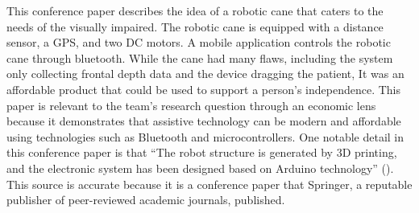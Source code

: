 
This conference paper describes the idea of a robotic cane that caters to the needs of the visually impaired. The robotic
            cane is equipped with a distance sensor, a GPS, and two DC motors. A mobile application controls the robotic cane through bluetooth.
            While the cane had many flaws, including the system only collecting frontal depth data and the device dragging the patient, It was an affordable product that could be used to support a person's independence.
            This paper is relevant to the team's research question through an economic lens because it demonstrates that assistive technology can be modern and affordable using technologies such as Bluetooth and microcontrollers.
            One notable detail in this conference paper is that ``The robot structure is generated by 3D printing, and the electronic system has been designed based on Arduino technology'' (\cite{10.1007/978-3-030-49282-3_36}).
            \\This source is accurate because it is a conference paper that Springer, a reputable publisher of peer-reviewed academic journals, published. 


